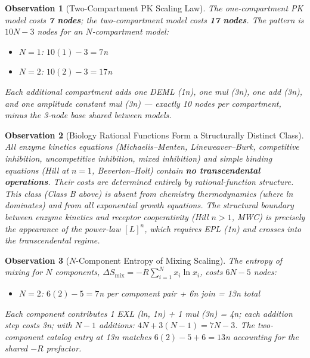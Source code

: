 \documentclass[12pt,a4paper]{article}
\newtheorem{observation}{Observation}[section]
\theoremstyle{definition}
\begin{document}
\begin{observation}[Two-Compartment PK Scaling Law]
\label{obs:pk-scaling}
The one-compartment PK model costs \textbf{7 nodes}; the two-compartment model
costs \textbf{17 nodes}.  The pattern is $10N - 3$ nodes for an $N$-compartment
model:
\begin{itemize}[noitemsep]
\item $N=1$: $10(1)-3 = 7$n \checkmark
\item $N=2$: $10(2)-3 = 17$n \checkmark
\end{itemize}
Each additional compartment adds one DEML (1n), one mul (3n), one add (3n),
and one amplitude constant mul (3n) --- exactly 10 nodes per compartment,
minus the 3-node base shared between models.
\end{observation}

\begin{observation}[Biology Rational Functions Form a Structurally Distinct Class]
\label{obs:rational-class}
All enzyme kinetics equations (Michaelis--Menten, Lineweaver--Burk,
competitive inhibition, uncompetitive inhibition, mixed inhibition)
and simple binding equations (Hill at $n=1$, Beverton--Holt) contain
\textbf{no transcendental operations}.  Their costs are determined entirely
by rational-function structure.  This class (Class B above) is absent
from chemistry thermodynamics (where ln dominates) and from all exponential
growth equations.  The structural boundary between enzyme kinetics and
receptor cooperativity (Hill $n>1$, MWC) is precisely the appearance
of the power-law $[L]^n$, which requires EPL (1n) and crosses into
the transcendental regime.
\end{observation}

\begin{observation}[$N$-Component Entropy of Mixing Scaling]
\label{obs:entropy-mixing}
The entropy of mixing for $N$ components,
$\Delta S_\mathrm{mix} = -R \sum_{i=1}^N x_i \ln x_i$,
costs $6N - 5$ nodes:
\begin{itemize}[noitemsep]
\item $N=2$: $6(2)-5 = 7$n per component pair + 6n join = 13n total \checkmark
\end{itemize}
Each component contributes 1 EXL (ln, 1n) + 1 mul (3n) = 4n; each
addition step costs 3n; with $N-1$ additions: $4N + 3(N-1) = 7N-3$.
The two-component catalog entry at 13n matches $6(2)-5+6 = 13$n
accounting for the shared $-R$ prefactor.
\end{observation}

\end{document}

